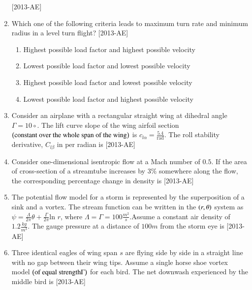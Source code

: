 \documentclass[journal]{IEEEtran}
\begin{document}
\begin{enumerate}[start=27]
    \hfill{[2013-AE]}
\item Which one of the following criteria leads to maximum turn rate and minimum radius in a level turn flight? \hfill{[2013-AE]}
\begin{enumerate}
    \item Highest possible load factor and highest possible velocity
    \item Lowest possible load factor and lowest possible velocity
    \item Highest possible load factor and lowest possible velocity
    \item Lowest possible load factor and highest possible velocity
\end{enumerate}
\item Consider an airplane with a rectangular straight wing at dihedral angle $\Gamma = 10{\circ}$. The lift curve slope of the wing airfoil section $\left(\text{constant over the whole span of the wing}\right)$ is $c_{l \alpha} = \frac{5.4}{\text{rad}}$. The roll stability derivative, $C_{l \beta}$ in per radian is \underline{\hspace{1cm}} \hfill{[2013-AE]}\\
\item Consider one-dimensional isentropic flow at a Mach number of $0.5$. If the area of cross-section of a streamtube increases by $3\%$ somewhere along the flow, the corresponding percentage change in density is \underline{\hspace{1cm}} \hfill{[2013-AE]}\\
\item The potential flow model for a storm is represented by the superposition of a sink and a vortex. The stream function can be written in the $\left(r,\theta\right)$ system as $\psi=\frac{\Lambda}{2\pi}\theta+\frac{\Gamma}{2\pi} \text{ln } r$, where $\Lambda=\Gamma=100 \frac{m^2}{s}$.Assume a constant air density of $1.2 \frac{kg}{m^3}$. The gauge pressure at a distance of $100 m$ from the storm eye is \hfill{[2013-AE]}
\begin{enumerate}
\end{enumerate}
\item Three identical eagles of wing span $s$ are flying side by side in a straight line with no gap between their wing tips. Assume a single horse shoe vortex model $\left(\text{of equal strength}\Gamma\right)$ for each bird. The net downwash experienced by the middle bird is \hfill{[2013-AE]}

\end{enumerate}
\end{document}
